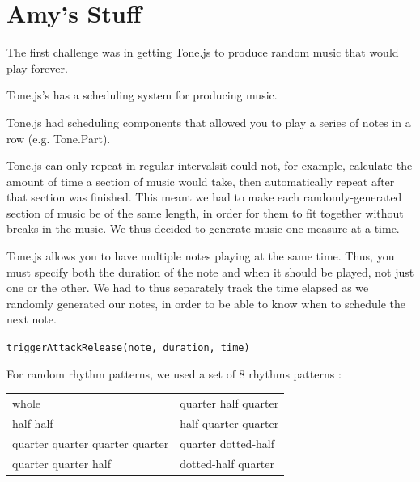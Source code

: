 \documentclass[12pt,a4paper]{article}
\begin{document}

\section{Amy's Stuff}

The first challenge was in getting Tone.js to produce random music that would play forever.

Tone.js's has a scheduling system for producing music.

Tone.js had scheduling components that allowed you to play a series of notes in a row (e.g. Tone.Part).

Tone.js can only repeat in regular intervals\textemdash it could not, for example, calculate the amount of time a section of music would take, then automatically repeat after that section was finished. This meant we had to make each randomly-generated section of music be of the same length, in order for them to fit together without breaks in the music. We thus decided to generate music one measure at a time.

Tone.js allows you to have multiple notes playing at the same time. Thus, you must specify both the duration of the note and when it should be played, not just one or the other. We had to thus separately track the time elapsed as we randomly generated our notes, in order to be able to know when to schedule the next note.

\texttt{triggerAttackRelease(note, duration, time)}

For random rhythm patterns, we used a set of 8 rhythms patterns \cite{common-rhythms}:

\begin{center}
\begin{tabular}{p{6cm} p{6cm}}
whole & %
quarter half quarter \\ %
half half & %
half quarter quarter \\ %
quarter quarter quarter quarter & %
quarter dotted-half \\ %
quarter quarter half & %
dotted-half quarter %
\end{tabular}
\end{center}
\end{document}
